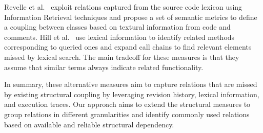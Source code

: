 \documentclass{sig-alternate}
\begin{document}
Revelle et al.~\cite{Denys:couple11} exploit relations captured from the source code lexicon using Information Retrieval techniques and propose a set of semantic metrics to define a coupling between classes based on textural information from code and comments. Hill et al.~\cite{Hill:neighbor07} use lexical information to identify related methods  corresponding to queried ones and expand call chains to find relevant elements missed by lexical search.  The main tradeoff for these measures is that they assume that similar terms always indicate related functionality.  

In summary, these alternative measures  aim to capture relations that are missed by existing structural coupling by leveraging revision history, lexical information, and execution traces. Our approach aims to extend the structural measures to group relations in different granularities and identify commonly used relations based on available and reliable structural dependency.  



%

 
\end{document}
